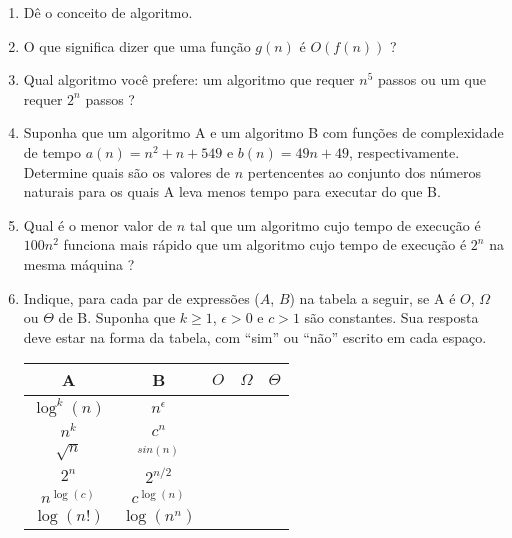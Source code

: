 \begin{enumerate}
\item Dê o conceito de algoritmo.

\item O que significa dizer que uma função $g(n)$ é $O(f(n))$ ?

\item Qual algoritmo você prefere: um algoritmo que requer $n^5$ passos ou um que requer $2^n$ passos ?

\item Suponha que um algoritmo A e um algoritmo B com funções de complexidade de tempo 
$a(n) = n^2 + n + 549$ e $b(n) = 49n + 49$, respectivamente. Determine quais são os valores
de $n$ pertencentes ao conjunto dos números naturais para os quais A leva menos tempo para
executar do que B.

\item Qual é o menor valor de $n$ tal que um algoritmo cujo tempo de execução é $100n^2$ funciona 
mais rápido que um algoritmo cujo tempo de execução é $2^n$ na mesma máquina ?

\item Indique, para cada par de expressões ($A$, $B$) na tabela a seguir, se A é $O$, $\Omega$ ou $\Theta$ 
de B. Suponha que $k \geq 1$, $\epsilon > 0$ e $c > 1$ são constantes. Sua resposta deve estar na forma da tabela, com
``sim'' ou ``não'' escrito em cada espaço.
%
\begin{table}[ht]
\begin{tabular}{cc|c|c|c|}
\hline
A & B & $O$ 				& $\Omega$ & $\Theta$ \\ \hline
$\log^k(n)$ & $n^\epsilon$ 		& \hspace{1cm} &  \hspace{1cm} &  \hspace{1cm} \\ \hline
$n^k$ & $c^n$ 				&  &  &  \\ \hline
$\sqrt{n}$ & $^{sin(n)}$  		&  &  &  \\ \hline
$2^n$ & $2^{n/2}$  			&  &  &  \\ \hline
$n^{\log (c)}$ & $c^{\log (n)}$  	&  &  &  \\ \hline
$\log (n!)$ & $\log (n^n)$ 		&  &  &  \\ \hline
\end{tabular}
\end{table}

\end{enumerate}
